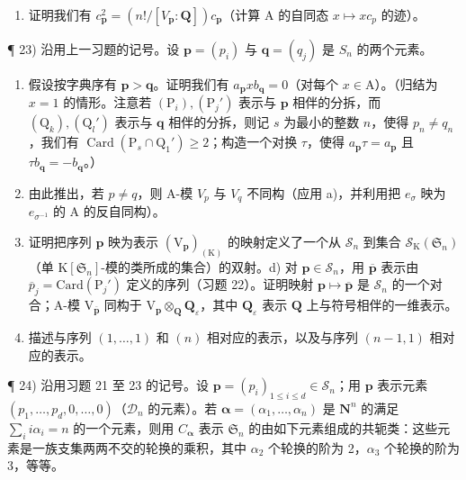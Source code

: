 \begin{enumerate}
\def\labelenumi{\alph{enumi})}
\setcounter{enumi}{4}
\tightlist
\item
  证明我们有 \(c_{\mathbf{p}}^{2} = (n!/[V_{\mathbf{p}} : \mathbf{Q}]) c_{\mathbf{p}}\)（计算 A 的自同态 \(x \mapsto xc_{p}\) 的迹）。
\end{enumerate}

¶ 23) 沿用上一习题的记号。设 \(\mathbf{p} = (p_i)\) 与 \(\mathbf{q} = (q_j)\) 是 \(S_n\) 的两个元素。

\begin{enumerate}
\def\labelenumi{\alph{enumi})}
\item
  假设按字典序有 \(\mathbf{p} > \mathbf{q}\)。证明我们有 \(a_{\mathbf{p}}xb_{\mathbf{q}} = 0\)（对每个 \(x \in \mathrm{A}\)）。（归结为 \(x = 1\) 的情形。注意若 \((\mathrm{P}_i), (\mathrm{P}_j')\) 表示与 \(\mathbf{p}\) 相伴的分拆，而 \((\mathrm{Q}_k), (\mathrm{Q}_l')\) 表示与 \(\mathbf{q}\) 相伴的分拆，则记 \(s\) 为最小的整数 \(n\)，使得 \(p_n \neq q_n\)，我们有 \(\operatorname{Card}(\mathrm{P}_s \cap \mathrm{Q}_1') \geqslant 2\)；构造一个对换 \(\tau\)，使得 \(a_{\mathbf{p}}\tau = a_{\mathbf{p}}\) 且 \(\tau b_{\mathbf{q}} = -b_{\mathbf{q}}\)。）
\item
  由此推出，若 \(p \neq q\)，则 A-模 \(V_{p}\) 与 \(V_{q}\) 不同构（应用 a)，并利用把 \(e_{\sigma}\) 映为 \(e_{\sigma^{-1}}\) 的 A 的反自同构）。
\item
  证明把序列 \(\mathbf{p}\) 映为表示 \((\mathrm{V}_{\mathbf{p}})_{(\mathrm{K})}\) 的映射定义了一个从 \(\mathcal{S}_n\) 到集合 \(\mathcal{S}_{\mathrm{K}}(\mathfrak{S}_n)\)（单 \(\mathrm{K}[\mathfrak{S}_n]\)-模的类所成的集合）的双射。d) 对 \(\mathbf{p} \in \mathcal{S}_n\)，用 \(\overline{\mathbf{p}}\) 表示由 \(\overline{p}_j = \mathrm{Card}(\mathrm{P}_j')\) 定义的序列（习题 22）。证明映射 \(\mathbf{p} \mapsto \overline{\mathbf{p}}\) 是 \(\mathcal{S}_n\) 的一个对合；A-模 \(\mathrm{V}_{\overline{\mathbf{p}}}\) 同构于 \(\mathrm{V}_{\mathbf{p}} \otimes_{\mathbf{Q}} \mathbf{Q}_{\varepsilon}\)，其中 \(\mathbf{Q}_{\varepsilon}\) 表示 \(\mathbf{Q}\) 上与符号相伴的一维表示。
\item
  描述与序列 \((1, \ldots, 1)\) 和 \((n)\) 相对应的表示，以及与序列 \((n - 1, 1)\) 相对应的表示。
\end{enumerate}

¶ 24) 沿用习题 21 至 23 的记号。设 \(\mathbf{p} = (p_i)_{1 \leqslant i \leqslant d} \in \mathcal{S}_n\)；用 \(\mathbf{p}\) 表示元素 \((p_1, \ldots, p_d, 0, \ldots, 0)\)（\(\mathcal{D}_n\) 的元素）。若 \(\boldsymbol{\alpha} = (\alpha_1, \ldots, \alpha_n)\) 是 \(\mathbf{N}^n\) 的满足 \(\sum_i i\alpha_i = n\) 的一个元素，则用 \(C_{\boldsymbol{\alpha}}\) 表示 \(\mathfrak{S}_n\) 的由如下元素组成的共轭类：这些元素是一族支集两两不交的轮换的乘积，其中 \(\alpha_2\) 个轮换的阶为 2，\(\alpha_3\) 个轮换的阶为 3，等等。

